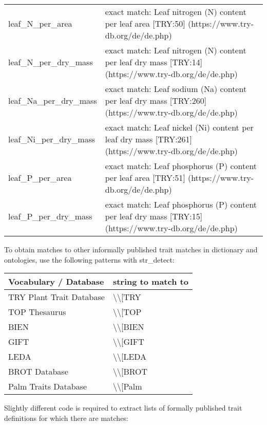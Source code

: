 \documentclass[
  letterpaper,
  DIV=11,
  numbers=noendperiod]{scrartcl}
\begin{document}
\begin{tabular}{>{\raggedright\arraybackslash}p{5cm}>{\raggedright\arraybackslash}p{12cm}}
leaf\_N\_per\_area & exact match: Leaf nitrogen (N) content per leaf area [TRY:50] (https://www.try-db.org/de/de.php)\\
\addlinespace
leaf\_N\_per\_dry\_mass & exact match: Leaf nitrogen (N) content per leaf dry mass [TRY:14] (https://www.try-db.org/de/de.php)\\
leaf\_Na\_per\_dry\_mass & exact match: Leaf sodium (Na) content per leaf dry mass [TRY:260] (https://www.try-db.org/de/de.php)\\
leaf\_Ni\_per\_dry\_mass & exact match: Leaf nickel (Ni) content per leaf dry mass [TRY:261] (https://www.try-db.org/de/de.php)\\
leaf\_P\_per\_area & exact match: Leaf phosphorus (P) content per leaf area [TRY:51] (https://www.try-db.org/de/de.php)\\
leaf\_P\_per\_dry\_mass & exact match: Leaf phosphorus (P) content per leaf dry mass [TRY:15] (https://www.try-db.org/de/de.php)\\
\bottomrule
\end{tabular}

To obtain matches to other informally published trait matches in
dictionary and ontologies, use the following patterns with str\_detect:

\begin{longtable}[]{@{}ll@{}}
\toprule\noalign{}
Vocabulary / Database & string to match to \\
\midrule\noalign{}
\endhead
\bottomrule\noalign{}
\endlastfoot
TRY Plant Trait Database & \textbackslash\textbackslash{[}TRY \\
TOP Thesaurus & \textbackslash\textbackslash{[}TOP \\
BIEN & \textbackslash\textbackslash{[}BIEN \\
GIFT & \textbackslash\textbackslash{[}GIFT \\
LEDA & \textbackslash\textbackslash{[}LEDA \\
BROT Database & \textbackslash\textbackslash{[}BROT \\
Palm Traits Database & \textbackslash\textbackslash{[}Palm \\
\end{longtable}

Slightly different code is required to extract lists of formally
published trait definitions for which there are matches:
\end{document}
